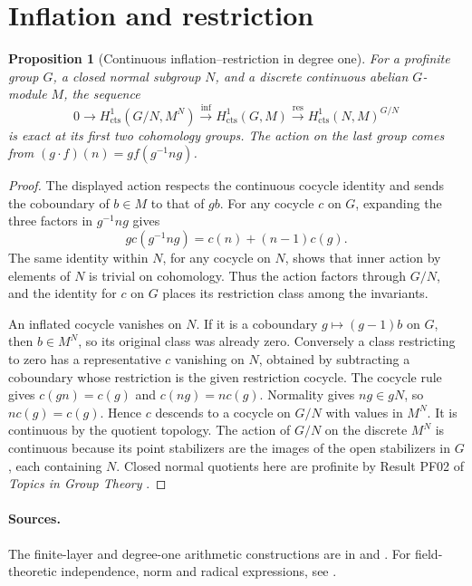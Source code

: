 \documentclass[11pt,oneside,openany]{book}
\newtheorem{proposition}[theorem]{Proposition}
\theoremstyle{definition}
\theoremstyle{remark}
\begin{document}
\section{Inflation and restriction}

\begin{proposition}[Continuous inflation--restriction in degree one]
\label{res:GH14}
For a profinite group \(G\), a closed normal subgroup \(N\), and a
discrete continuous abelian \(G\)-module \(M\), the sequence
\[
 0\longrightarrow H^1_{\mathrm{cts}}(G/N,M^N)
 \xrightarrow{\mathrm{inf}} H^1_{\mathrm{cts}}(G,M)
 \xrightarrow{\mathrm{res}} H^1_{\mathrm{cts}}(N,M)^{G/N}
\]
is exact at its first two cohomology groups. The action on the last
group comes from \((g\cdot f)(n)=g f(g^{-1}ng)\).
\end{proposition}
\begin{proof}
The displayed action respects the continuous cocycle identity
and sends the coboundary of \(b\in M\) to that of \(gb\).
For any cocycle \(c\) on \(G\), expanding the three factors in
\(g^{-1}ng\) gives
\[
 g c(g^{-1}ng)=c(n)+(n-1)c(g).
\]
The same identity within \(N\), for any cocycle on \(N\), shows
that inner action by elements of \(N\) is trivial on cohomology.
Thus the action factors through \(G/N\), and the identity for
\(c\) on \(G\) places its restriction class among the invariants.

An inflated cocycle vanishes on \(N\). If it is a coboundary
\(g\mapsto(g-1)b\) on \(G\), then \(b\in M^N\), so its original
class was already zero. Conversely a class restricting to zero
has a representative \(c\) vanishing on \(N\), obtained by subtracting
a coboundary whose restriction is the given restriction cocycle.
The cocycle rule gives \(c(gn)=c(g)\) and \(c(ng)=n c(g)\).
Normality gives \(ng\in gN\), so \(n c(g)=c(g)\). Hence \(c\)
descends to a cocycle on \(G/N\) with values in \(M^N\).
It is continuous by the quotient topology. The action of \(G/N\)
on the discrete \(M^N\) is continuous because its point stabilizers
are the images of the open stabilizers in \(G\), each containing
\(N\). Closed normal quotients here are profinite by Result PF02
of \emph{Topics in Group Theory} \cite[PDF pp.~15--16]{mg-groups}.
\end{proof}

\paragraph{Sources.}
The finite-layer and degree-one arithmetic constructions are in
\cite[Sections 2.2, 2.4--2.5]{sharifi} and
\cite[Chapter~I, Sections 2--3 and 5]{serregc}.
For field-theoretic independence, norm and radical expressions,
see \cite[Chapter~5]{milneft}.
\end{document}
